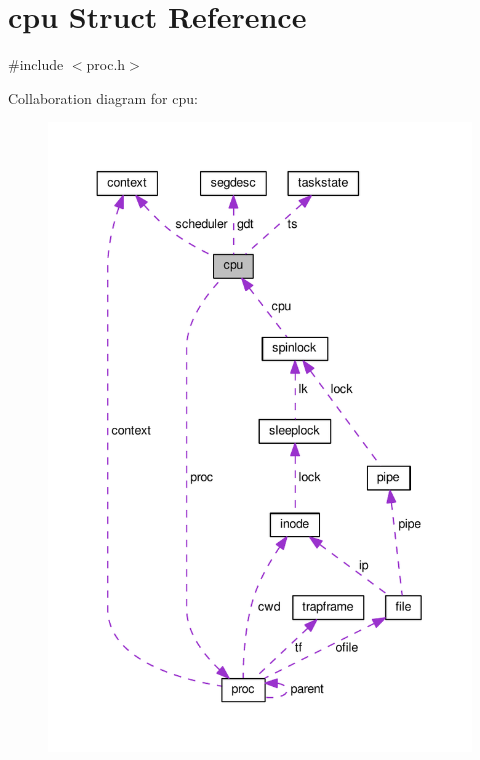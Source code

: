 \hypertarget{structcpu}{}\section{cpu Struct Reference}
\label{structcpu}


{\ttfamily \#include $<$proc.\+h$>$}



Collaboration diagram for cpu\+:\nopagebreak
\begin{figure}[H]
\begin{center}
\leavevmode
\includegraphics[width=344pt]{d0/de5/structcpu__coll__graph}
\end{center}
\end{figure}
